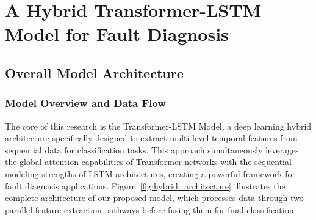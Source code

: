 \chapter{A Hybrid Transformer-LSTM Model for Fault Diagnosis}
\label{cha:hybrid_model}

\section{Overall Model Architecture}
\label{sec:hybrid_model:architecture}

\subsection{Model Overview and Data Flow}
The core of this research is the Transformer-LSTM Model, a deep learning hybrid architecture specifically designed to extract multi-level temporal features from sequential data for classification tasks. This approach simultaneously leverages the global attention capabilities of Transformer networks with the sequential modeling strengths of LSTM architectures, creating a powerful framework for fault diagnosis applications. Figure~\ref{fig:hybrid_architecture} illustrates the complete architecture of our proposed model, which processes data through two parallel feature extraction pathways before fusing them for final classification.


